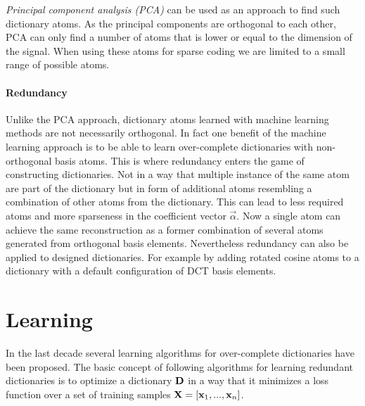 \emph{Principal component analysis (PCA)} can be used as an approach to find
such dictionary atoms. As the principal components are orthogonal to each other,
PCA can only find a number of atoms that is lower or equal to the
dimension of the signal. When using these atoms for sparse coding we
are limited to a small range of possible atoms.

\paragraph{Redundancy} Unlike the PCA approach,
dictionary atoms learned with machine learning methods are not necessarily
orthogonal. In fact one benefit of the machine learning approach is to be able
to learn over-complete dictionaries with non-orthogonal basis atoms. This is
where redundancy enters the game of constructing dictionaries. Not in a way
that multiple instance of the same atom are part of the dictionary but in
form of additional atoms resembling a combination of other atoms from
the dictionary. This can lead to less required atoms and more sparseness in the
coefficient vector $\vec{\alpha}$. Now a single atom can achieve the same
reconstruction as a former combination of several atoms generated from
orthogonal basis elements.
Nevertheless redundancy can also be applied to designed dictionaries. For
example by adding rotated cosine atoms to a dictionary with a default
configuration of DCT basis elements.


\section{Learning}
In the last decade several learning algorithms for over-complete dictionaries
have been proposed. 
The basic concept of following algorithms for learning
redundant dictionaries is to optimize a dictionary $\boldsymbol{\mathrm{D}}$ in a
way that it minimizes a loss function over a set of training samples
$\boldsymbol{\mathrm{X}}=[\boldsymbol{\mathrm{x}}_1,...,\boldsymbol{\mathrm{x}}_n]$.

